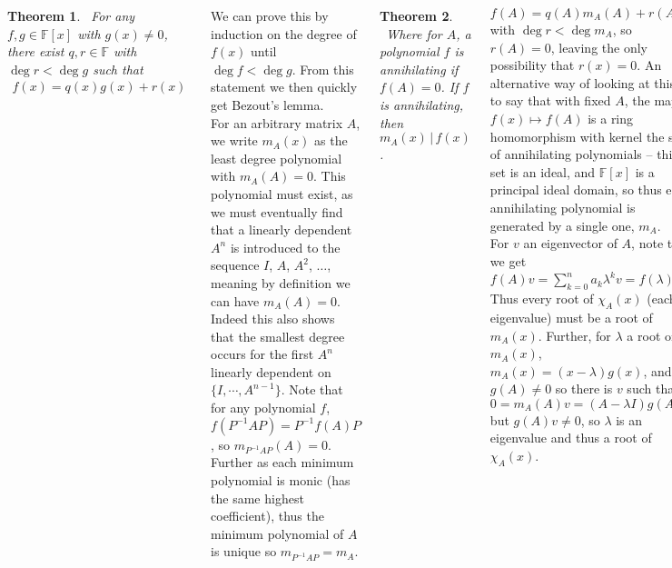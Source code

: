 \documentclass{tikzposter} %
\newtheorem{theorem}{Theorem}
\begin{document}
\begin{columns}
{{     \begin{theorem}
       \ For any $f, g \in \mathbb{F}[x]$ with $g(x) \neq 0$, there exist $q, r \in \mathbb{F}$ with $\deg r < \deg g$ such that
       \begin{align*}
         f(x) = q(x)g(x) + r(x)
       \end{align*}
     \end{theorem}
     \hphantom{}

     We can prove this by induction on the degree of $f(x)$ until $\deg f < \deg g$. From this statement we then quickly get Bezout's lemma. \\

     For an arbitrary matrix $A$, we write $m_{A}(x)$ as the least degree polynomial with $m_{A}(A) = 0$. This polynomial must exist, as we must eventually find that a linearly dependent $A^{n}$ is introduced to the sequence $I$, $A$, $A^{2}$, $\dots$, meaning by definition we can have $m_{A}(A) = 0$. Indeed this also shows that the smallest degree occurs for the first $A^{n}$ linearly dependent on $\{I, \cdots, A^{n-1}\}$. Note that for any polynomial $f$, $f(P^{-1}AP) = P^{-1}f(A)P$, so $m_{P^{-1}AP}(A) = 0$. Further as each minimum polynomial is monic (has the same highest coefficient), thus the minimum polynomial of $A$ is unique so $m_{P^{-1}AP} = m_{A}$. \\

     \begin{theorem}
     \ Where for $A$, a polynomial $f$ is annihilating if $f(A) = 0$. If $f$ is annihilating, then $m_{A}(x)\,|\,f(x)$.
     \end{theorem}
     \hphantom{}

     $f(A) = q(A)m_{A}(A)+r(A)$ with $\deg r < \deg m_{A}$, so $r(A) = 0$, leaving the only possibility that $r(x) = 0$. An alternative way of looking at this is to say that with fixed $A$, the map $f(x) \mapsto f(A)$ is a ring homomorphism with kernel the set of annihilating polynomials -- this set is an ideal, and $\mathbb{F}[x]$ is a principal ideal domain, so thus each annihilating polynomial is generated by a single one, $m_{A}$. \\

     For $v$ an eigenvector of $A$, note that we get $f(A)v = \sum_{k=0}^{n}a_{k}\lambda^{k}v = f(\lambda)v$. Thus every root of $\chi_{A}(x)$ (each eigenvalue) must be a root of $m_{A}(x)$. Further, for $\lambda$ a root of $m_{A}(x)$, $m_{A}(x) = (x-\lambda)g(x)$, and $g(A) \neq 0$ so there is $v$ such that $0 = m_{A}(A)v = (A-\lambda I) g(A)v$ but $g(A)v \neq 0$, so $\lambda$ is an eigenvalue and thus a root of $\chi_{A}(x)$. \\

}}
\end{columns}
\end{document}
